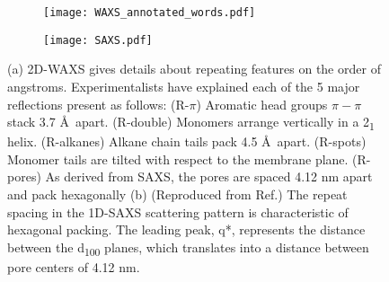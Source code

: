   \begin{figure}[!htb]
        \centering
                \begin{subfigure}[t]{0.495\linewidth}
                \centering
                \texttt{[image: WAXS\_annotated\_words.pdf]} 
                \caption{}\label{fig:WAXS}
        \end{subfigure}
	\begin{subfigure}[t]{0.38\linewidth}
                \centering
                \texttt{[image: SAXS.pdf]}
                \caption{}\label{fig:SAXS}
        \end{subfigure}
	\caption{(a) 2D-WAXS gives details about repeating features on the
order of angstroms. Experimentalists have explained each of the 5 major
reflections present as follows: (R-$\pi$) Aromatic head groups $\pi-\pi$ stack
3.7 \AA~apart. (R-double) Monomers arrange vertically in a 2\textsubscript{1}
helix. (R-alkanes) Alkane chain tails pack 4.5 \AA~apart. (R-spots) Monomer
tails are tilted with respect to the membrane plane. (R-pores) As derived from
SAXS, the pores are spaced 4.12 nm apart and pack hexagonally (b) (Reproduced
from Ref.\cite{feng_thin_2016}) The repeat spacing in the 1D-SAXS scattering
pattern is characteristic of hexagonal packing. The leading peak, q*,
represents the distance between the d\textsubscript{100} planes, which
translates into a distance between pore centers of 4.12 nm.} 
	\label{fig:SWAXS}
 \end{figure}
  
